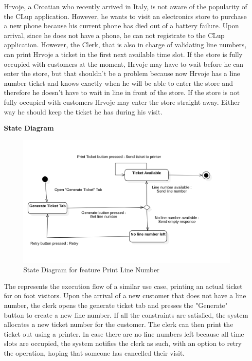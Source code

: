 Hrvoje, a Croatian who recently arrived in Italy, is not aware of the popularity of the CLup application. However, he wants to visit an electronics store to purchase a new phone because his current phone has died out of a battery failure.
Upon arrival, since he does not have a phone, he can not registrate to the CLup application. However, the Clerk, that is also in charge of validating line numbers, can print Hrvoje a ticket in the first next available time slot.
If the store is fully occupied with customers at the moment, Hrvoje may have to wait before he can enter the store, but that shouldn't be a problem because now Hrvoje has a line number ticket and knows exactly when he will
be able to enter the store and therefore he doesn't have to wait in line in front of the store. If the store is not fully occupied with customers Hrvoje may enter the store straight away. Either way he should keep the ticket he has during his visit.

\textbf{State Diagram}

\begin{figure}[H]
    \centering
    \includegraphics[height=0.4\textwidth]{Images/StateCharts/PrintTicket.png}
    \caption{State Diagram for feature Print Line Number}
    \label{fig:SDPrintLine}
\end{figure}

The  represents the execution flow of a similar use case, printing an actual ticket for on foot visitors.
Upon the arrival of a new customer that does not have a line number, the clerk opens the generate ticket tab and presses the "Generate" button to create a new line number.
If all the constraints are satisfied, the system allocates a new ticket number for the customer.
The clerk can then print the ticket out using a printer.
In case there are no line numbers left because all time slots are occupied, the system notifies the clerk as such, with an option to retry the operation, hoping that someone has cancelled their visit.


